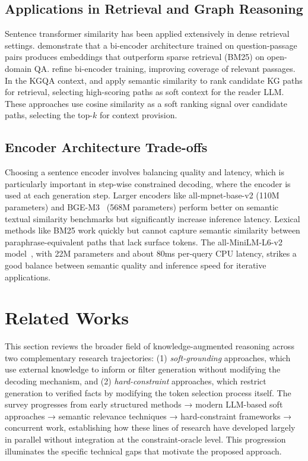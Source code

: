 \subsection{Applications in Retrieval and Graph Reasoning}

Sentence transformer similarity has been applied extensively in dense retrieval settings. \citet{karpukhin2020dpr} demonstrate that a bi-encoder architecture trained on question-passage pairs produces embeddings that outperform sparse retrieval (BM25) on open-domain QA. \citet{xiong2020adore} refine bi-encoder training, improving coverage of relevant passages. In the KGQA context, \citet{shi2021kgpath} and \citet{saxena2022kgqa} apply semantic similarity to rank candidate KG paths for retrieval, selecting high-scoring paths as soft context for the reader LLM. These approaches use cosine similarity as a soft ranking signal over candidate paths, selecting the top-$k$ for context provision.

\subsection{Encoder Architecture Trade-offs}

Choosing a sentence encoder involves balancing quality and latency, which is particularly important in step-wise constrained decoding, where the encoder is used at each generation step. Larger encoders like all-mpnet-base-v2 (110M parameters) and BGE-M3~\citep{chen2024bge} (568M parameters) perform better on semantic textual similarity benchmarks but significantly increase inference latency. Lexical methods like BM25 work quickly but cannot capture semantic similarity between paraphrase-equivalent paths that lack surface tokens. The all-MiniLM-L6-v2 model~\citep{reimers2019sbert}, with 22M parameters and about 80ms per-query CPU latency, strikes a good balance between semantic quality and inference speed for iterative applications.

\section{Related Works}
\label{sec:related}
This section reviews the broader field of knowledge-augmented reasoning across two complementary research trajectories: (1) \textit{soft-grounding} approaches, which use external knowledge to inform or filter generation without modifying the decoding mechanism, and (2) \textit{hard-constraint} approaches, which restrict generation to verified facts by modifying the token selection process itself. The survey progresses from early structured methods → modern LLM-based soft approaches → semantic relevance techniques → hard-constraint frameworks → concurrent work, establishing how these lines of research have developed largely in parallel without integration at the constraint-oracle level. This progression illuminates the specific technical gaps that motivate the proposed approach.

